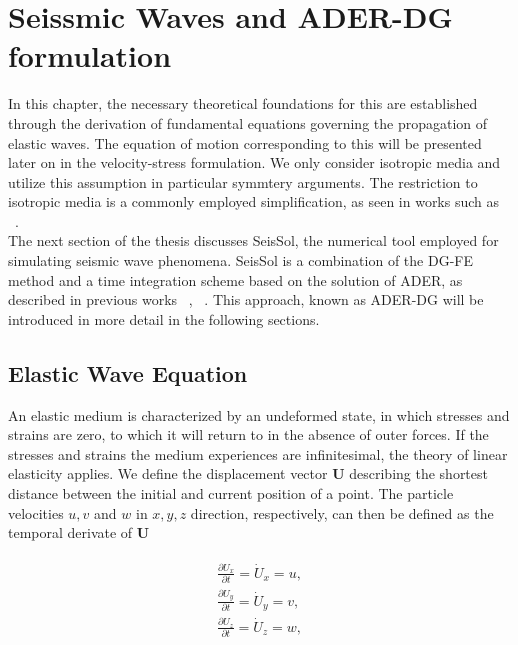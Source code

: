 
\chapter{Seissmic Waves and ADER-DG formulation}\label{chapter:seismicwaves}
In this chapter, the necessary theoretical foundations for this are established through the derivation of fundamental equations governing the propagation of elastic waves.
The equation of motion corresponding to this will be presented later on in the velocity-stress formulation.
We only consider isotropic media and utilize this assumption in particular symmtery arguments. The restriction to isotropic media is a commonly employed simplification, as seen in works such as ~\parencite{dumbser1}. \\

The next section of the thesis discusses SeisSol, the numerical tool employed for simulating seismic wave phenomena. SeisSol is a combination
of the \ac{DG-FE} method and a time integration scheme based on the solution of \ac{ADER}, as described in previous works ~\parencite{dumbser1}, ~\parencite{seissol}. This approach, known as 
\ac{ADER}-\ac{DG} will be introduced in more detail in the following sections.

\section{Elastic Wave Equation}\label{section:elasticwaveequation}
An elastic medium is characterized by an undeformed state, in which stresses and strains are zero, to which it will return to in the absence
of outer forces. If the stresses and strains the medium experiences are infinitesimal, the theory of linear elasticity applies. We define
the displacement vector $\mathbf{U}$ describing the shortest distance between the initial and current position of a point. The particle
velocities $u,v$ and $w$ in $x, y, z$ direction, respectively, can then be defined as the temporal derivate of $\mathbf{U}$

\begin{align}
    \begin{split}
    \frac{\partial U_x}{\partial t} = \dot{U}_x = u, \\
    \frac{\partial U_y}{\partial t} = \dot{U}_y = v, \\
    \frac{\partial U_z}{\partial t} = \dot{U}_z = w, \\
    \end{split}
 \end{align}

